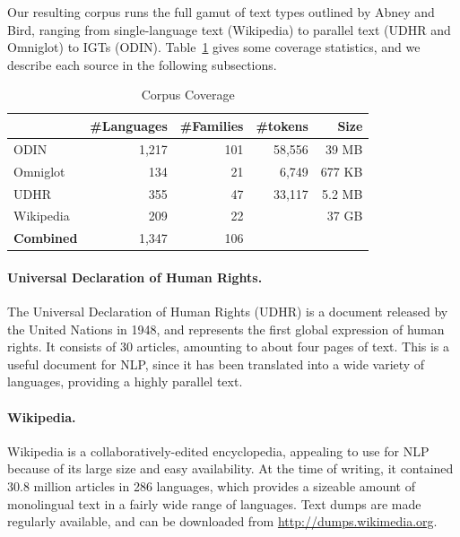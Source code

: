 Our resulting corpus runs the full gamut of text types outlined by Abney and Bird, ranging from single-language text (Wikipedia) to parallel text (UDHR and Omniglot) to IGTs (ODIN).  Table~\ref{table:corpus} gives some coverage statistics, and we describe each source in the following subsections.


\begin{table}[t]
\small
\centering
    \begin{tabular}{l|rr|rr}
    ~         				& \#Languages & \#Families 	&\#tokens		& Size	\\ \hline
    ODIN      				& 1,217      & 101       		& 58,556		& 39 MB		\\
    Omniglot  				& 134        & 21        		&	6,749			& 677 KB	\\
    UDHR      				& 355        & 47        		&	33,117		& 5.2 MB	\\
    Wikipedia 				& 209        & 22       		&						& 37 GB		\\ \hline
    \textbf{Combined}	& 1,347			 & 106 
    \end{tabular}
\caption{Corpus Coverage}
\label{table:corpus}
\end{table}



\paragraph{Universal Declaration of Human Rights.}

The Universal Declaration of Human Rights (UDHR) is a document released by the United Nations in 1948, and represents the first global expression of human rights. It consists of 30 articles, amounting to about four pages of text. This is a useful document for NLP, since it has been translated into a wide variety of languages, providing a highly parallel text.


\paragraph{Wikipedia.}

Wikipedia is a collaboratively-edited encyclopedia, appealing to use for NLP because of its large size and easy availability. At the time of writing, it contained 30.8 million articles in 286 languages, which provides a sizeable amount of monolingual text in a fairly wide range of languages. Text dumps are made regularly available, and can be downloaded from \url{http://dumps.wikimedia.org}.

